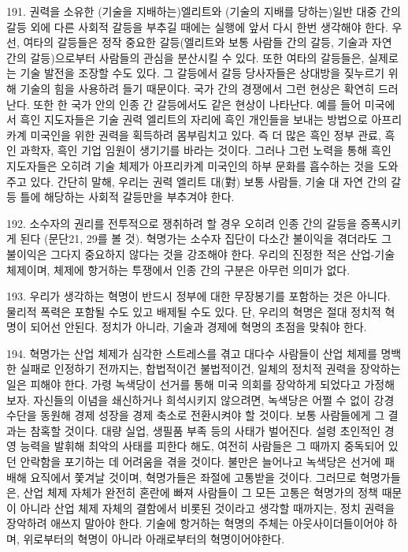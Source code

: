 \documentclass[11pt,a4paper]{article}
\begin{document}
\begin{multicols}{2}
191. 권력을 소유한 (기술을 지배하는)엘리트와 (기술의 지배를 당하는)일반 대중 간의 갈등 외에 다른  사회적 갈등을 부추길 때에는 실행에 앞서 다시 한번 생각해야 한다. 우선, 여타의 갈등들은 정작 중요한 
갈등(엘리트와 보통 사람들 간의 갈등, 기술과 자연 간의 갈등)으로부터 사람들의 관심을 분산시킬 수  있다. 또한 여타의 갈등들은, 실제로는 기술 발전을 조장할 수도 있다. 그 갈등에서 갈등 당사자들은  상대방을 짖누르기 위해 기술의 힘을 사용하려 들기 때문이다. 국가 간의 경쟁에서 그런 현상은 확연히  드러난다. 또한 한 국가 안의 인종 간 갈등에서도 같은 현상이 나타난다. 예를 들어 미국에서 흑인  지도자들은 기술 권력 엘리트의 자리에 흑인 개인들을 보내는 방법으로 아프리카계 미국인을 위한 권력을 획득하려 몸부림치고 있다. 즉 더 많은 흑인 정부 관료, 흑인 과학자, 흑인 기업 임원이 생기기를 바라는  것이다. 그러나 그런 노력을 통해 흑인 지도자들은 오히려 기술 체제가 아프리카계 미국인의 하부 문화를  흡수하는 것을 도와주고 있다. 간단히 말해, 우리는 권력 엘리트 대(對) 보통 사람들, 기술 대 자연 간의  갈등 틀에 해당하는 사회적 갈등만을 부추겨야 한다.  


192. 소수자의 권리를 전투적으로 쟁취하려 할 경우 오히려 인종 간의 갈등을 증폭시키게 된다 (문단21,  29를 볼 것). 혁명가는 소수자 집단이 다소간 불이익을 겪더라도 그 불이익은 그다지 중요하지 않다는  것을 강조해야 한다. 우리의 진정한 적은 산업-기술 체제이며, 체제에 항거하는 투쟁에서 인종 간의  구분은 아무런 의미가 없다.  


193. 우리가 생각하는 혁명이 반드시 정부에 대한 무장봉기를 포함하는 것은 아니다. 물리적 폭력은  포함될 수도 있고 배제될 수도 있다. 단, 우리의 혁명은 절대 정치적 혁명이 되어선 안된다. 정치가  아니라, 기술과 경제에 혁명의 초점을 맞춰야 한다.  


194. 혁명가는 산업 체제가 심각한 스트레스를 겪고 대다수 사람들이 산업 체제를 명백한 실패로  인정하기 전까지는, 합법적이건 불법적이건, 일체의 정치적 권력을 장악하는 일은 피해야 한다. 가령 녹색당이 선거를 통해 미국 의회를 장악하게 되었다고 가정해 보자. 자신들의 이념을 쇄신하거나  희석시키지 않으려면, 녹색당은 어쩔 수 없이 강경 수단을 동원해 경제 성장을 경제 축소로 전환시켜야 할 것이다. 보통 사람들에게 그 결과는 참혹할 것이다. 대량 실업, 생필품 부족 등의 사태가 벌어진다. 설령 초인적인 경영 능력을 발휘해 최악의 사태를 피한다 해도, 여전히 사람들은 그 때까지 중독되어 있던 안락함을 포기하는 데 어려움을 겪을 것이다. 불만은 늘어나고 녹색당은 선거에 패배해 요직에서 쫓겨날  것이며, 혁명가들은 좌절에 고통받을 것이다. 그러므로 혁명가들은, 산업 체제 자체가 완전히 혼란에 빠져 사람들이 그 모든 고통은 혁명가의 정책 때문이 아니라 산업 체제 자체의 결함에서 비롯된 것이라고  생각할 때까지는, 정치 권력을 장악하려 애쓰지 말아야 한다. 기술에 항거하는 혁명의 주체는  아웃사이더들이어야 하며, 위로부터의 혁명이 아니라 아래로부터의 혁명이어야한다.  



\end{multicols}
\end{document}
